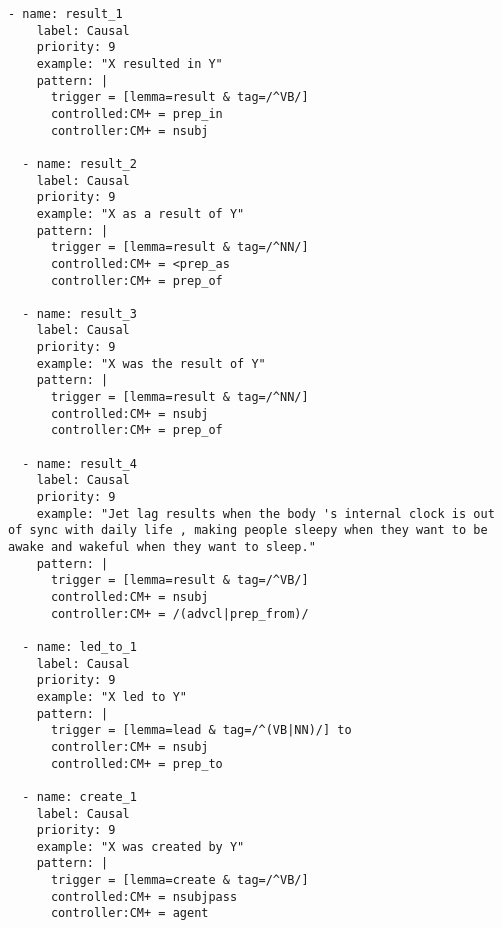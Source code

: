 \begin{singlespace}
\begin{lstlisting}[caption={Rules for causal relations (events).  Note that the cause and effect arguments are previously found causal mentions.}]
  - name: result_1
    label: Causal
    priority: 9
    example: "X resulted in Y"
    pattern: |
      trigger = [lemma=result & tag=/^VB/]
      controlled:CM+ = prep_in
      controller:CM+ = nsubj

  - name: result_2
    label: Causal
    priority: 9
    example: "X as a result of Y"
    pattern: |
      trigger = [lemma=result & tag=/^NN/]
      controlled:CM+ = <prep_as
      controller:CM+ = prep_of

  - name: result_3
    label: Causal
    priority: 9
    example: "X was the result of Y"
    pattern: |
      trigger = [lemma=result & tag=/^NN/]
      controlled:CM+ = nsubj
      controller:CM+ = prep_of

  - name: result_4
    label: Causal
    priority: 9
    example: "Jet lag results when the body 's internal clock is out of sync with daily life , making people sleepy when they want to be awake and wakeful when they want to sleep."
    pattern: |
      trigger = [lemma=result & tag=/^VB/]
      controlled:CM+ = nsubj
      controller:CM+ = /(advcl|prep_from)/

  - name: led_to_1
    label: Causal
    priority: 9
    example: "X led to Y"
    pattern: |
      trigger = [lemma=lead & tag=/^(VB|NN)/] to
      controller:CM+ = nsubj
      controlled:CM+ = prep_to

  - name: create_1
    label: Causal
    priority: 9
    example: "X was created by Y"
    pattern: |
      trigger = [lemma=create & tag=/^VB/]  
      controlled:CM+ = nsubjpass
      controller:CM+ = agent

\end{lstlisting}
\end{singlespace}